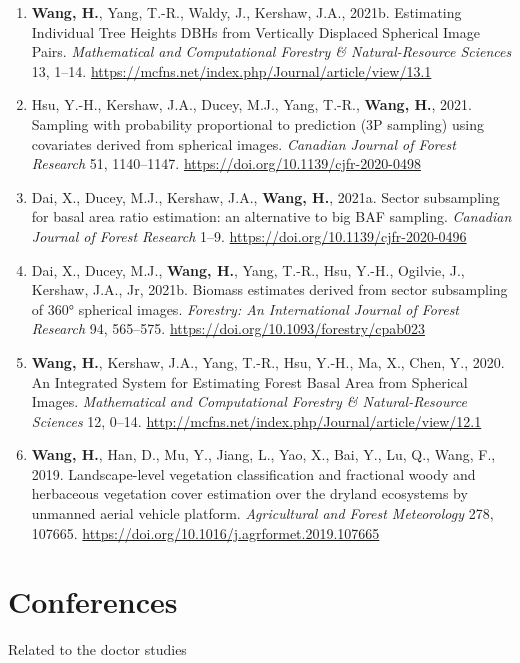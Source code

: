 \begin{singlespace}
\begin{enumerate}
  \item \textbf{Wang, H.}, Yang, T.-R., Waldy, J., Kershaw, J.A., 2021b. Estimating Individual Tree Heights DBHs from Vertically Displaced Spherical Image Pairs. \textit{Mathematical and Computational Forestry \& Natural-Resource Sciences} 13, 1–14. \url{https://mcfns.net/index.php/Journal/article/view/13.1}
  \item Hsu, Y.-H., Kershaw, J.A., Ducey, M.J., Yang, T.-R., \textbf{Wang, H.}, 2021. Sampling with probability proportional to prediction (3P sampling) using covariates derived from spherical images. \textit{Canadian Journal of Forest Research} 51, 1140–1147. \url{https://doi.org/10.1139/cjfr-2020-0498}
  \item Dai, X., Ducey, M.J., Kershaw, J.A., \textbf{Wang, H.}, 2021a. Sector subsampling for basal area ratio estimation: an alternative to big BAF sampling. \textit{Canadian Journal of Forest Research} 1–9. \url{https://doi.org/10.1139/cjfr-2020-0496}
  \item Dai, X., Ducey, M.J., \textbf{Wang, H.}, Yang, T.-R., Hsu, Y.-H., Ogilvie, J., Kershaw, J.A., Jr, 2021b. Biomass estimates derived from sector subsampling of 360° spherical images. \textit{Forestry: An International Journal of Forest Research} 94, 565–575. \url{https://doi.org/10.1093/forestry/cpab023}
  \item \textbf{Wang, H.}, Kershaw, J.A., Yang, T.-R., Hsu, Y.-H., Ma, X., Chen, Y., 2020. An Integrated System for Estimating Forest Basal Area from Spherical Images. \textit{Mathematical and Computational Forestry \& Natural-Resource Sciences} 12, 0–14. \url{http://mcfns.net/index.php/Journal/article/view/12.1}
  \item \textbf{Wang, H.}, Han, D., Mu, Y., Jiang, L., Yao, X., Bai, Y., Lu, Q., Wang, F., 2019. Landscape-level vegetation classification and fractional woody and herbaceous vegetation cover estimation over the dryland ecosystems by unmanned aerial vehicle platform. \textit{Agricultural and Forest Meteorology} 278, 107665. \url{https://doi.org/10.1016/j.agrformet.2019.107665}
\end{enumerate}

\section*{Conferences}

\noindent
Related to the doctor studies


\end{singlespace}
